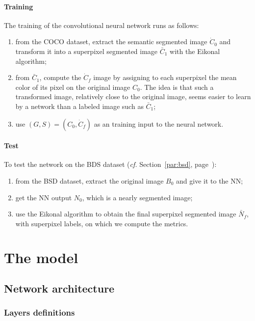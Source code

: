 \documentclass{article}
\begin{document}
        \paragraph{Training}
        The training of the convolutional neural network runs as follows:
        \begin{enumerate}
            \item from the COCO dataset, extract the semantic segmented image $\dot C_0$ and transform it into a superpixel segmented image $\bar C_1$ with the Eikonal algorithm;
            \item from $\bar C_1$, compute the $\dot C_f$ image by assigning to each superpixel the mean color of its pixel on the original image $C_0$. The idea is that such a transformed image, relatively close to the original image, seems easier to learn by a network than a labeled image such as $\bar C_1$;
            \item use $(G,S)=(C_0, \dot C_f)$ as an training input to the neural network.
        \end{enumerate}
        \paragraph{Test}
        To test the network on the BDS dataset (\textit{cf.} Section~\ref{par:bsd}, page~\pageref{par:bsd}):
        \begin{enumerate}
            \item from the BSD dataset, extract the original image $B_0$ and give it to the NN;
            \item get the NN output $N_0$, which is a nearly segmented image;
            \item use the Eikonal algorithm to obtain the final superpixel segmented image $\bar N_f$, with superpixel labels, on which we compute the metrics.
        \end{enumerate}



\section{The model}
    \subsection{Network architecture}
        \subsubsection{Layers definitions}
\end{document}
